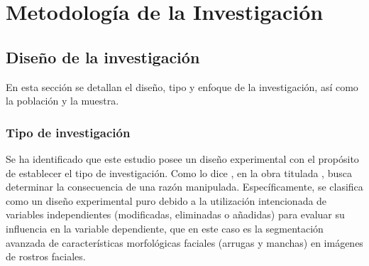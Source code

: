 \chapter{Metodología de la Investigación}
\section{Diseño de la investigación}
En esta sección se detallan el diseño, tipo y enfoque de la investigación, así como la población y la muestra.

\subsection{Tipo de investigación}
Se ha identificado que este estudio posee un diseño experimental con el propósito de establecer el tipo de investigación. Como lo dice \cite{bk_hernandez2014metodologia}, en la obra titulada , busca determinar la consecuencia de una razón manipulada. Específicamente, se clasifica como un diseño experimental puro debido a la utilización intencionada de variables independientes (modificadas, eliminadas o añadidas) para evaluar su influencia en la variable dependiente, que en este caso es la segmentación avanzada de características morfológicas faciales (arrugas y manchas) en imágenes de rostros faciales.


